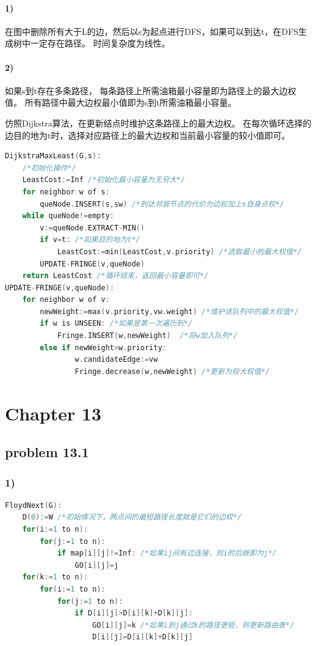 \documentclass[11pt,a4paper,oneside,oldfontcommands]{ctexart}
\begin{document}
\paragraph*{1)}
在图中删除所有大于L的边，然后以s为起点进行DFS，如果可以到达t，在DFS生成树中一定存在路径。
时间复杂度为线性。
\paragraph*{2)}
如果s到t存在多条路径，
每条路径上所需油箱最小容量即为路径上的最大边权值。
所有路径中最大边权最小值即为s到t所需油箱最小容量。

仿照Dijkstra算法，在更新结点时维护这条路径上的最大边权。
在每次循环选择的边目的地为t时，选择对应路径上的最大边权和当前最小容量的较小值即可。

\begin{lstlisting}[language=C++,title=DijkstraMaxLeast.func]
DijkstraMaxLeast(G,s):
	/*初始化操作*/
	LeastCost:=Inf /*初始化最小容量为无穷大*/
	for neighbor w of s:
		queNode.INSERT(s,sw) /*到达邻居节点的代价为边权加上s自身点权*/
	while queNode!=empty:
		v:=queNode.EXTRACT-MIN()
		if v=t: /*如果目的地为t*/
			LeastCost:=min(LeastCost,v.priority) /*选取最小的最大权值*/
		UPDATE-FRINGE(v,queNode)
	return LeastCost /*循环结束，返回最小容量即可*/
UPDATE-FRINGE(v,queNode):
	for neighbor w of v:
		newWeight:=max(v.priority,vw.weight) /*维护该队列中的最大权值*/
		if w is UNSEEN: /*如果是第一次遍历到*/
			Fringe.INSERT(w,newWeight)  /*将w加入队列*/
		else if newWeight>w.priority:
				w.candidateEdge:=vw
				Fringe.decrease(w,newWeight) /*更新为较大权值*/
\end{lstlisting}
\newpage
\section*{Chapter 13}
{\subsection*{problem 13.1}}
\subsubsection*{1)}
\begin{lstlisting}[language=C++,title=FloydNext.func]
FloydNext(G):
	D(0):=W /*初始情况下，两点间的最短路径长度就是它们的边权*/
	for(i:=1 to n):
		for(j:=1 to n):
			if map[i][j]!=Inf: /*如果ij间有边连接，则i的后继即为j*/
				GO[i][j]=j
	for(k:=1 to n):
		for(i:=1 to n):
			for(j:=1 to n):
				if D[i][j]>D[i][k]+D[k][j]:
					GO[i][j]=k /*如果i到j通过k的路径更短，则更新路由表*/
					D[i][j]=D[i][k]+D[k][j]
\end{lstlisting}
\end{document}
